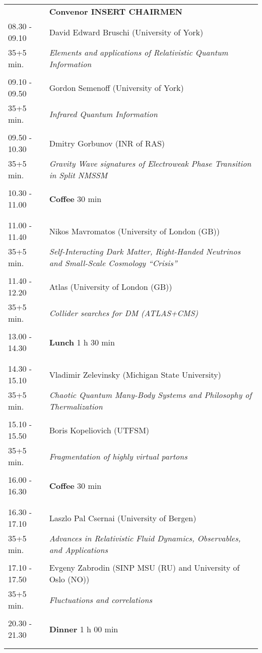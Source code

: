 \begin{longtable}{p{3cm}p{13cm}}
&\hfill {\bf Convenor INSERT CHAIRMEN }\\ 
08.30 - 09.10 & David Edward Bruschi (University of York)\\ 
35+5 min. & {\it Elements and applications of Relativistic Quantum Information}\\ 
 & \\ 
09.10 - 09.50 & Gordon Semenoff (University of York)\\ 
35+5 min. & {\it Infrared Quantum Information}\\ 
 & \\ 
09.50 - 10.30 & Dmitry Gorbunov (INR of RAS)\\ 
35+5 min. & {\it Gravity Wave signatures of Electroweak Phase Transition in Split NMSSM}\\ 
 & \\ 
10.30 - 11.00 & {\bf Coffee} \hfill 30 min \\ 
 & \\ 
 & \\ 
11.00 - 11.40 & Nikos Mavromatos (University of London (GB))\\ 
35+5 min. & {\it Self-Interacting Dark Matter, Right-Handed Neutrinos and Small-Scale Cosmology ``Crisis''}\\ 
 & \\ 
11.40 - 12.20 & Atlas (University of London (GB))\\ 
35+5 min. & {\it Collider searches for DM (ATLAS+CMS)}\\ 
 & \\ 
13.00 - 14.30 & {\bf Lunch} \hfill 1 h 30 min \\ 
 & \\ 
 & \\ 
14.30 - 15.10 & Vladimir Zelevinsky (Michigan State University)\\ 
35+5 min. & {\it Chaotic Quantum Many-Body Systems and Philosophy of Thermalization}\\ 
 & \\ 
15.10 - 15.50 & Boris Kopeliovich (UTFSM)\\ 
35+5 min. & {\it Fragmentation of highly virtual partons}\\ 
 & \\ 
16.00 - 16.30 & {\bf Coffee} \hfill 30 min \\ 
 & \\ 
 & \\ 
16.30 - 17.10 & Laszlo Pal Csernai (University of Bergen)\\ 
35+5 min. & {\it Advances in Relativistic Fluid Dynamics, Observables, and Applications}\\ 
 & \\ 
17.10 - 17.50 & Evgeny Zabrodin (SINP MSU (RU) and University of Oslo (NO))\\ 
35+5 min. & {\it Fluctuations and correlations}\\ 
 & \\ 
20.30 - 21.30 & {\bf Dinner} \hfill 1 h 00 min \\ 
 & \\ 
 & \\ 
\end{longtable}

